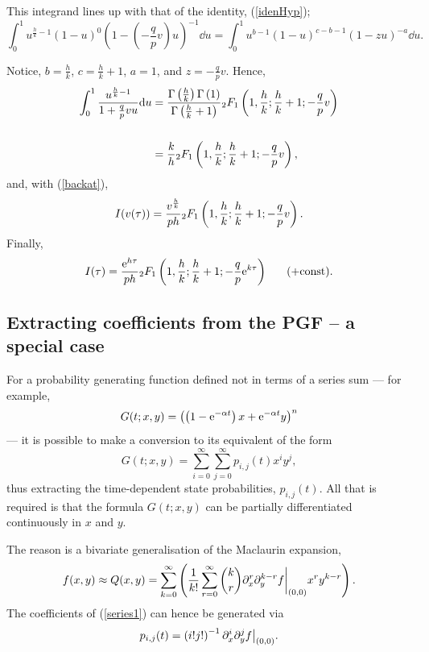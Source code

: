 \noindent
This integrand lines up with that of the identity, (\ref{idenHyp});
\begin{equation*}
\int^1_0u^{\frac{h}{k}-1}(1-u)^0 \left(1-\left(-\frac{q}{p}v\right) u\right)^{-1} \dd u= \int^1_0 u^{b-1}(1-u)^{c-b-1}(1-zu)^{-a} \dd u.
\end{equation*}

\noindent
Notice, $b = \frac{h}{k}$, $c = \frac{h}{k}+1$,  $a = 1$,  and $z = -\frac{q}{p}v$. Hence,
\begin{align*}
\int^1_0\frac{u^{\frac{h}{k}-1}}{1+\frac{q}{p}vu}  {\rm d} u &= \frac{\Gamma\left(\frac{h}{k}\right) \Gamma\left(1\right)}{\Gamma\left(\frac{h}{k} +1\right)} {}_2F_1\left(1,\frac{h}{k};\frac{h}{k}+1; -\frac{q}{p}v\right)\\
\notag\\
&= \frac{k}{h} {}_2F_1\left(1,\frac{h}{k};\frac{h}{k}+1; -\frac{q}{p}v\right),
\end{align*}
and, with (\ref{backat}),
\begin{equation*}
I(v(\tau)) = \frac{v^{\frac{h}{k}}}{ph}{}_2F_1\left(1,\frac{h}{k};\frac{h}{k}+1; -\frac{q}{p}v\right).
\end{equation*}
Finally,
$$I(\tau) = \frac{{\rm e}^{h\tau}}{ph}{}_2F_1\left(1,\frac{h}{k};\frac{h}{k}+1; -\frac{q}{p}{\rm e}^{k\tau}\right)\hspace{17pt} (+ \text{const}).$$


\subsection{Extracting coefficients from the PGF -- a special case}

For a probability generating function defined not in terms of a series sum --- for example,
\begin{equation}
\label{examplePgf}
G(t;x,y) =  \left(\left(1-{\rm e}^{-\alpha t}\right) x + {\rm e}^{-\alpha t}y\right)^n
\end{equation}
--- it is possible to make a conversion to its equivalent of the form
\begin{equation}
\label{series1}
G(t;x,y) = \sum^{\infty}_{i=0}\sum^{\infty}_{j=0} p_{i,j}(t)x^iy^j,
\end{equation}
thus extracting the time-dependent state probabilities, $p_{i,j}(t)$. All that is required is that the formula $G(t;x,y)$ can be partially differentiated continuously in $x$ and $y$.\par
The reason is a bivariate generalisation of the Maclaurin expansion,
$$f(x,y)\approx Q(x,y) = \sum^{\infty}_{k=0} \left(\frac{1}{k!} \sum^{\infty}_{r=0}{k \choose r} \partial_x^r \partial_y^{k-r}f\bigg |_{(0,0)} x^r y^{k-r} \right). $$
The coefficients of (\ref{series1}) can hence be generated via
\begin{equation}
\label{stateProb}
p_{i,j}(t) = \left( i!j!\right)^{-1} \partial_x^i \partial_y^{j}f\big |_{(0,0)}.
\end{equation}

